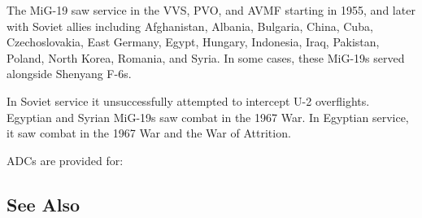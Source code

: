 The MiG-19 saw service in the VVS, PVO, and AVMF starting in 1955, and later with Soviet allies including Afghanistan, Albania, Bulgaria, China, Cuba, Czechoslovakia, East Germany, Egypt, Hungary, Indonesia, Iraq, Pakistan, Poland, North Korea, Romania, and Syria. In some cases, these MiG-19s served alongside Shenyang F-6s.

In Soviet service it unsuccessfully attempted to intercept U-2 overflights. Egyptian and Syrian MiG-19s saw combat in the 1967 War. In Egyptian service, it saw combat in the 1967 War and the War of Attrition.

ADCs are provided for:
\begin{adclist}
\end{adclist}

\subsection{See Also}
\begin{typelist}
\end{typelist}